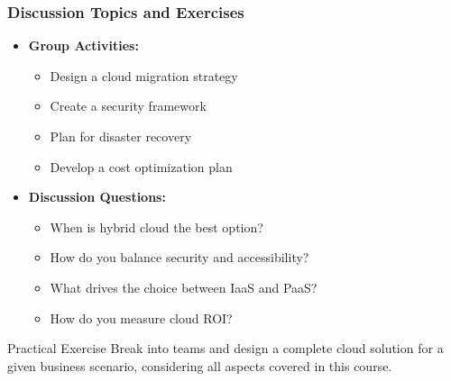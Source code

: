 \documentclass{beamer}
\begin{document}
\begin{frame}
    \frametitle{Discussion Topics and Exercises}
    
    \begin{itemize}
        \item \textbf{Group Activities:}
        \begin{itemize}
            \item Design a cloud migration strategy
            \item Create a security framework
            \item Plan for disaster recovery
            \item Develop a cost optimization plan
        \end{itemize}
        
        \item \textbf{Discussion Questions:}
        \begin{itemize}
            \item When is hybrid cloud the best option?
            \item How do you balance security and accessibility?
            \item What drives the choice between IaaS and PaaS?
            \item How do you measure cloud ROI?
        \end{itemize}
    \end{itemize}
    
    \begin{block}{Practical Exercise}
        Break into teams and design a complete cloud solution for a given business scenario, considering all aspects covered in this course.
    \end{block}
\end{frame}
\end{document}
